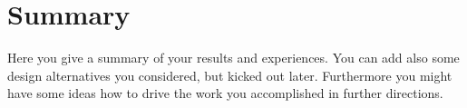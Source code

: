 \chapter{Summary}
Here you give a summary of your results and experiences. You can add also some design alternatives you considered, but kicked out later. Furthermore you might have some ideas how to drive the work you accomplished in further directions.

